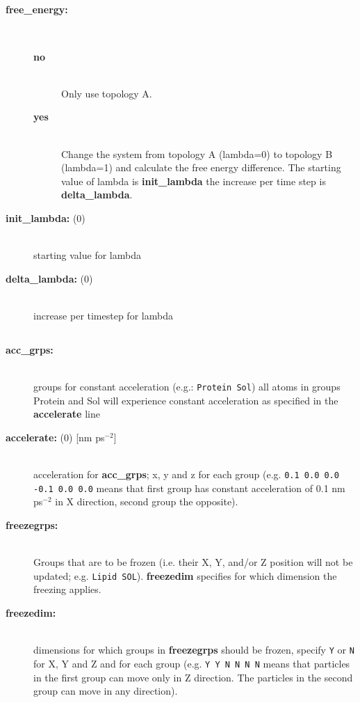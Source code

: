 \subsection{}
\begin{description}
\item[{\bf free\_energy:}]\mbox{}\\
\vspace{-2ex}\begin{description}
\item[{\bf no}]\mbox{}\\
Only use topology A. 
\item[{\bf yes}]\mbox{}\\
Change the system from topology A (lambda=0) to topology B (lambda=1)
and calculate the free energy difference.
The starting value of lambda is {\bf init\_lambda} the increase
per time step is {\bf delta\_lambda}.
\end{description}
\item[{\bf init\_lambda: }(0)]\mbox{}\\
starting value for lambda
\item[{\bf delta\_lambda: }(0)]\mbox{}\\
increase per timestep for lambda
\end{description}

\subsection{}
\begin{description}
\item[{\bf acc\_grps: }]\mbox{}\\
groups for constant acceleration (e.g.: {\tt Protein Sol})
all atoms in groups Protein and Sol will experience constant acceleration
as specified in the {\bf accelerate} line
\item[{\bf accelerate: }(0) {[nm ps$^{-2}$]}]\mbox{}\\
acceleration for {\bf acc\_grps}; x, y and z for each group
(e.g. {\tt 0.1 0.0 0.0 -0.1 0.0 0.0} means that first group has constant 
acceleration of 0.1 nm ps$^{-2}$ in X direction, second group the 
opposite).
\item[{\bf freezegrps: }]\mbox{}\\
Groups that are to be frozen (i.e. their X, Y, and/or Z position will
not be updated; e.g. {\tt Lipid SOL}). {\bf freezedim} specifies for
which dimension the freezing applies.
\item[{\bf freezedim: }]\mbox{}\\
dimensions for which groups in {\bf freezegrps} should be frozen, 
specify {\tt Y} or {\tt N} for X, Y and Z and for each group
(e.g. {\tt Y Y N N N N} means that particles in the first group 
can move only in Z direction. The particles in the second group can 
move in any direction).
\end{description}


